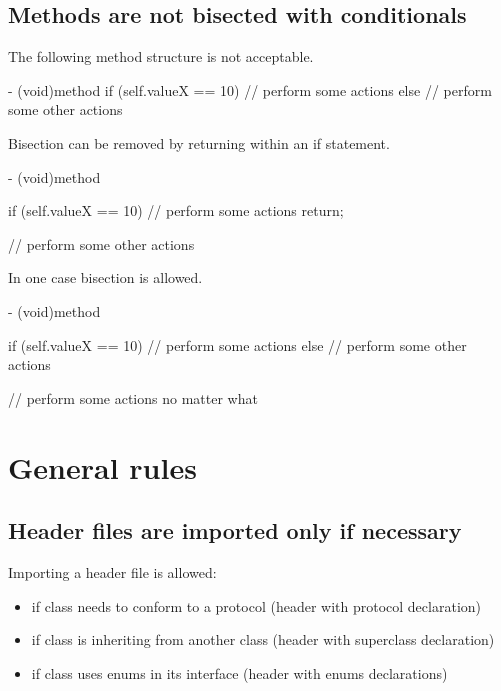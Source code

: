 \documentclass[10pt]{extarticle}
\newenvironment{codelisting}
{\footnotesize\mdframed[middlelinewidth=0.5pt, middlelinecolor=BaliHaiColor, skipabove=15pt]\verbatim}
{\endverbatim\endmdframed\vspace{12pt}\normalsize}
\begin{document}
\subsection{Methods are not bisected with conditionals}

The following method structure is not acceptable.

\begin{codelisting}
- (void)method
{
    if (self.valueX == 10) {
        // perform some actions
    }
    else {
        // perform some other actions
    }
}
\end{codelisting}

Bisection can be removed by returning within an if statement.

\begin{codelisting}
- (void)method
{
    if (self.valueX == 10) {
        // perform some actions
        return;
    }
    
    // perform some other actions
}
\end{codelisting}

In one case bisection is allowed.

\begin{codelisting}
- (void)method
{
    if (self.valueX == 10) {
        // perform some actions
    }
    else {
        // perform some other actions
    }
    
    // perform some actions no matter what
}
\end{codelisting}


\section{General rules}

\subsection{Header files are imported only if necessary}

Importing a header file is allowed:

\begin{itemize}
\item if class needs to conform to a protocol (header with protocol declaration)
\item if class is inheriting from another class (header with superclass declaration)
\item if class uses enums in its interface (header with enums declarations)
\end{itemize}
\end{document}
